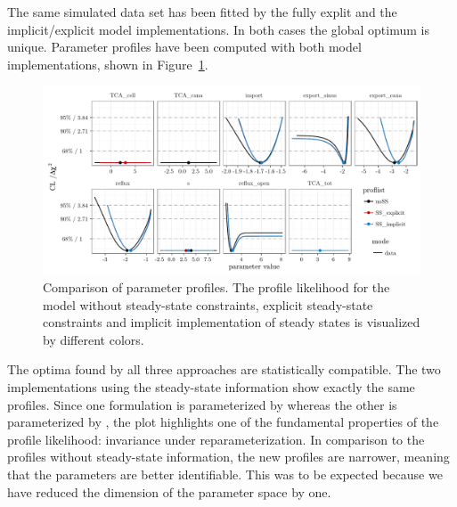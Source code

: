 \documentclass[article]{jss}
\begin{document}
The same simulated data set has been fitted by the fully explit and the implicit/explicit model implementations. In both cases the global optimum is unique. Parameter profiles have been computed with both model implementations, shown in Figure~\ref{fig:allprofiles}.
\begin{figure}[ht]
	\centering
	\includegraphics[width = \textwidth]{images/figure8}
	\caption{Comparison of parameter profiles. The profile likelihood for the model without steady-state constraints, explicit steady-state constraints and implicit implementation of steady states is visualized by different colors.}
	\label{fig:allprofiles}
\end{figure}
The optima found by all three approaches are statistically compatible. The two implementations using the steady-state information show exactly the same profiles. Since one formulation is parameterized by  whereas the other is parameterized by , the plot highlights one of the fundamental properties of the profile likelihood: invariance under reparameterization. In comparison to the profiles without steady-state information, the new profiles are narrower, meaning that the parameters are better identifiable. This was to be expected because we have reduced the dimension of the parameter space by one.
\end{document}
